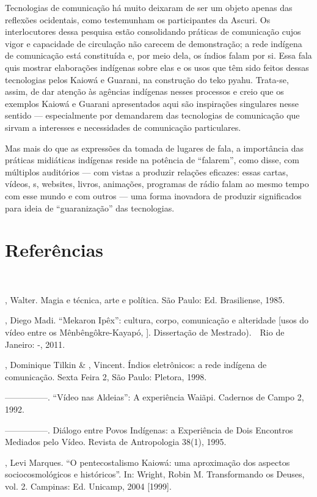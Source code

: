 {{Tecnologias de comunicação há muito deixaram de ser um objeto apenas das
reflexões ocidentais, como testemunham os participantes da Ascuri. Os
interlocutores dessa pesquisa estão consolidando práticas de
comunicação cujos vigor e capacidade de circulação não carecem de
demonstração; a rede indígena de comunicação está constituída e, por
meio dela, os índios falam por si. Essa fala quis mostrar elaborações
indígenas sobre elas e os usos que têm sido feitos dessas tecnologias
pelos Kaiowá e Guarani, na construção do teko pyahu. Trata-se, assim,
de dar atenção às agências indígenas nesses processos e creio que os
exemplos Kaiowá e Guarani apresentados aqui são inspirações singulares
nesse sentido --- especialmente por demandarem das tecnologias de
comunicação que sirvam a interesses e necessidades de comunicação
particulares. 

Mas mais do que as expressões da tomada de lugares de fala, a
importância das práticas midiáticas indígenas reside na potência de
``falarem'', como disse, com múltiplos auditórios --- com vistas a produzir
relações eficazes: essas cartas, vídeos, s, websites, livros,
animações, programas de rádio falam ao mesmo tempo com esse mundo e com
outros --- uma forma inovadora de produzir significados para ideia de
``guaranização'' das tecnologias.

\section{Referências}\ \  \ \ 

\begin{Parskip}
, Walter. Magia e técnica, arte e política. São Paulo: Ed.
Brasiliense, 1985.

, Diego Madi. ``Mekaron Ipêx'': cultura, corpo, comunicação e
alteridade [usos do vídeo entre os Mênbêngôkre-Kayapó, ]. Dissertação
de Mestrado).\ \ Rio de Janeiro: -, 2011. 

, Dominique Tilkin \& , Vincent. Índios eletrônicos: a
rede indígena de comunicação.  Sexta Feira 2, São Paulo: Pletora, 1998.


—————. ``Vídeo nas Aldeias'': A experiência Waiãpi. Cadernos de Campo 2,
1992.

—————. Diálogo entre Povos Indígenas: a Experiência de Dois Encontros
Mediados pelo Vídeo. Revista de Antropologia 38(1), 1995.

, Levi Marques. ``O pentecostalismo Kaiowá: uma aproximação dos
aspectos sociocosmológicos e históricos''. In: Wright, Robin M.
Transformando os Deuses, vol. 2. Campinas: Ed. Unicamp, 2004 [1999].
\end{Parskip}

}}
